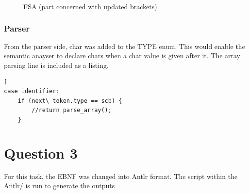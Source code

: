 \documentclass[a4paper, 12pt]{article}
\begin{document}
\begin{figure}[h]
    \centering
    \caption{FSA (part concerned with updated brackets)}
\end{figure}

\subsubsection{Parser}
From the parser side, char was added to the TYPE enum. This would enable the semantic anayser to declare chars when a char value is 
given after it. The array parsing line is included as a listing.

\begin{lstlisting}[caption=Array parsing]]
case identifier:    
    if (next\_token.type == scb) {
        //return parse_array();
    }
\end{lstlisting}

\section{Question 3}
For this task, the EBNF was changed into Antlr format. The script within the Antlr/ is run to generate the outputs
\end{document}
